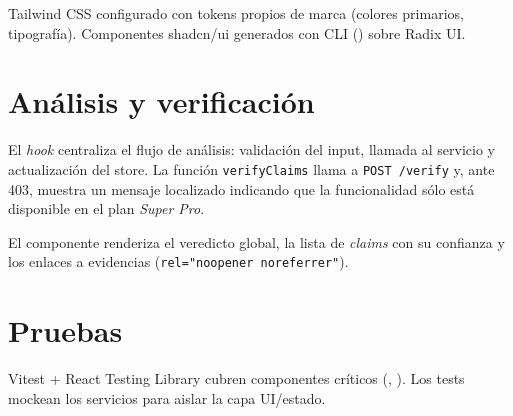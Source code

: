Tailwind CSS configurado con tokens propios de marca (colores
primarios, tipografía). Componentes shadcn/ui generados con CLI
() sobre Radix UI.

\section{Análisis y verificación}

El \emph{hook}  centraliza el flujo
de análisis: validación del input, llamada al servicio
 y actualización del store. La función
\texttt{verifyClaims} llama a \texttt{POST /verify} y, ante 403,
muestra un mensaje localizado indicando que la funcionalidad sólo está
disponible en el plan \emph{Super Pro}.

El componente
 renderiza el
veredicto global, la lista de \emph{claims} con su confianza y los
enlaces a evidencias (\texttt{rel="noopener noreferrer"}).

\section{Pruebas}

Vitest + React Testing Library cubren componentes críticos
(, ). Los tests
mockean los servicios para aislar la capa UI/estado.
